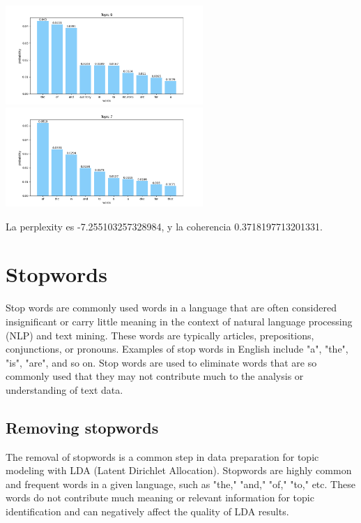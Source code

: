 \documentclass[10pt]{article} %
\begin{document}
\begin{center}
		\includegraphics[width=7.5cm]{images/plots/test_8/topic_6.png}
		\includegraphics[width=7.5cm]{images/plots/test_8/topic_7.png}
	\end{center}

	La perplexity es -7.255103257328984, y la coherencia  0.3718197713201331.
	
	\section{Stopwords}
	Stop words are commonly used words in a language that are often considered insignificant or carry little meaning in the context of natural language processing (NLP) and text mining. These words are typically articles, prepositions, conjunctions, or pronouns. Examples of stop words in English include "a", "the", "is", "are", and so on. Stop words are used to eliminate words that are so commonly used that they may not contribute much to the analysis or understanding of text data.
	
	\subsection{Removing stopwords}
	
	The removal of stopwords is a common step in data preparation for topic modeling with LDA (Latent Dirichlet Allocation). Stopwords are highly common and frequent words in a given language, such as "the," "and," "of," "to," etc. These words do not contribute much meaning or relevant information for topic identification and can negatively affect the quality of LDA results.
	
\end{document}
